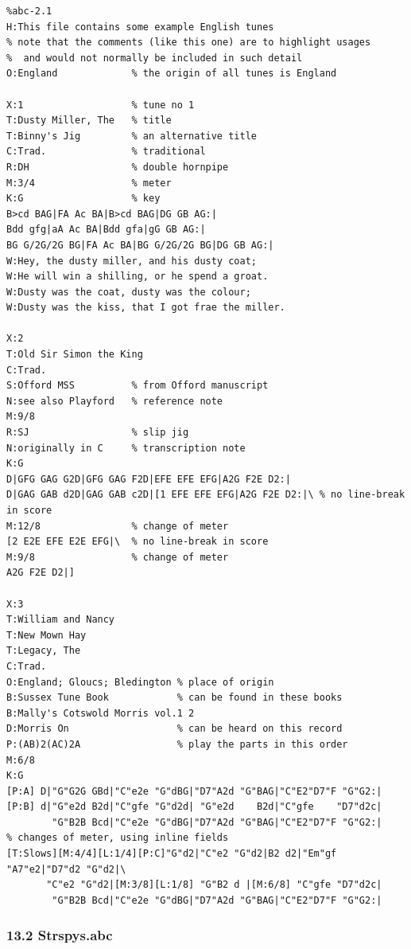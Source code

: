\documentclass[oneside]{book}
\begin{document}
\begin{verbatim}
%abc-2.1
H:This file contains some example English tunes
% note that the comments (like this one) are to highlight usages
%  and would not normally be included in such detail
O:England             % the origin of all tunes is England

X:1                   % tune no 1
T:Dusty Miller, The   % title
T:Binny's Jig         % an alternative title
C:Trad.               % traditional
R:DH                  % double hornpipe
M:3/4                 % meter
K:G                   % key
B>cd BAG|FA Ac BA|B>cd BAG|DG GB AG:|
Bdd gfg|aA Ac BA|Bdd gfa|gG GB AG:|
BG G/2G/2G BG|FA Ac BA|BG G/2G/2G BG|DG GB AG:|
W:Hey, the dusty miller, and his dusty coat;
W:He will win a shilling, or he spend a groat.
W:Dusty was the coat, dusty was the colour;
W:Dusty was the kiss, that I got frae the miller.

X:2
T:Old Sir Simon the King
C:Trad.
S:Offord MSS          % from Offord manuscript
N:see also Playford   % reference note
M:9/8
R:SJ                  % slip jig
N:originally in C     % transcription note
K:G
D|GFG GAG G2D|GFG GAG F2D|EFE EFE EFG|A2G F2E D2:|
D|GAG GAB d2D|GAG GAB c2D|[1 EFE EFE EFG|A2G F2E D2:|\ % no line-break in score
M:12/8                % change of meter
[2 E2E EFE E2E EFG|\  % no line-break in score
M:9/8                 % change of meter
A2G F2E D2|]

X:3
T:William and Nancy
T:New Mown Hay
T:Legacy, The
C:Trad.
O:England; Gloucs; Bledington % place of origin
B:Sussex Tune Book            % can be found in these books
B:Mally's Cotswold Morris vol.1 2
D:Morris On                   % can be heard on this record
P:(AB)2(AC)2A                 % play the parts in this order
M:6/8
K:G                        
[P:A] D|"G"G2G GBd|"C"e2e "G"dBG|"D7"A2d "G"BAG|"C"E2"D7"F "G"G2:|
[P:B] d|"G"e2d B2d|"C"gfe "G"d2d| "G"e2d    B2d|"C"gfe    "D7"d2c|
        "G"B2B Bcd|"C"e2e "G"dBG|"D7"A2d "G"BAG|"C"E2"D7"F "G"G2:|
% changes of meter, using inline fields
[T:Slows][M:4/4][L:1/4][P:C]"G"d2|"C"e2 "G"d2|B2 d2|"Em"gf "A7"e2|"D7"d2 "G"d2|\
       "C"e2 "G"d2|[M:3/8][L:1/8] "G"B2 d |[M:6/8] "C"gfe "D7"d2c|
        "G"B2B Bcd|"C"e2e "G"dBG|"D7"A2d "G"BAG|"C"E2"D7"F "G"G2:|
\end{verbatim}

\hypertarget{strspysabc}{\subsubsection{13.2
Strspys.abc}\label{strspysabc}}
\end{document}
